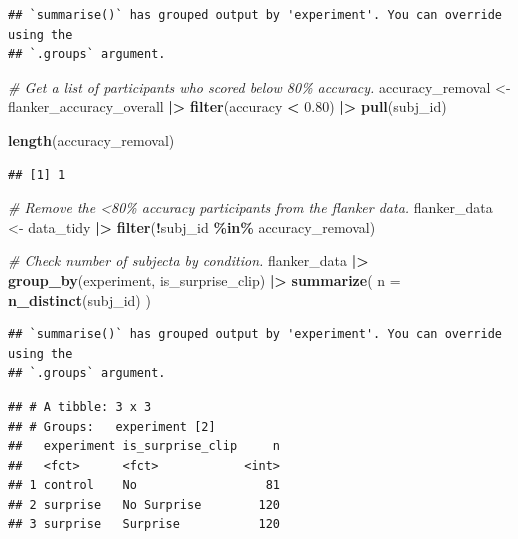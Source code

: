 \documentclass[
]{article}
\newenvironment{Shaded}{\begin{snugshade}}{\end{snugshade}}
\newcommand{\AttributeTok}[1]{\textcolor[rgb]{0.13,0.29,0.53}{#1}}
\newcommand{\CommentTok}[1]{\textcolor[rgb]{0.56,0.35,0.01}{\textit{#1}}}
\newcommand{\FloatTok}[1]{\textcolor[rgb]{0.00,0.00,0.81}{#1}}
\newcommand{\FunctionTok}[1]{\textcolor[rgb]{0.13,0.29,0.53}{\textbf{#1}}}
\newcommand{\NormalTok}[1]{#1}
\newcommand{\OtherTok}[1]{\textcolor[rgb]{0.56,0.35,0.01}{#1}}
\newcommand{\SpecialCharTok}[1]{\textcolor[rgb]{0.81,0.36,0.00}{\textbf{#1}}}
\begin{document}
\begin{verbatim}
## `summarise()` has grouped output by 'experiment'. You can override using the
## `.groups` argument.
\end{verbatim}

\begin{Shaded}
\begin{Highlighting}[]
\CommentTok{\# Get a list of participants who scored below 80\% accuracy.}
\NormalTok{accuracy\_removal }\OtherTok{\textless{}{-}}\NormalTok{ flanker\_accuracy\_overall }\SpecialCharTok{|\textgreater{}} 
  \FunctionTok{filter}\NormalTok{(accuracy }\SpecialCharTok{\textless{}} \FloatTok{0.80}\NormalTok{) }\SpecialCharTok{|\textgreater{}} 
  \FunctionTok{pull}\NormalTok{(subj\_id)}

\FunctionTok{length}\NormalTok{(accuracy\_removal)}
\end{Highlighting}
\end{Shaded}

\begin{verbatim}
## [1] 1
\end{verbatim}

\begin{Shaded}
\begin{Highlighting}[]
\CommentTok{\# Remove the \textless{}80\% accuracy participants from the flanker data.}
\NormalTok{flanker\_data }\OtherTok{\textless{}{-}}\NormalTok{ data\_tidy }\SpecialCharTok{|\textgreater{}} 
  \FunctionTok{filter}\NormalTok{(}\SpecialCharTok{!}\NormalTok{subj\_id }\SpecialCharTok{\%in\%}\NormalTok{ accuracy\_removal)}

\CommentTok{\# Check number of subjecta by condition.}
\NormalTok{flanker\_data }\SpecialCharTok{|\textgreater{}}
  \FunctionTok{group\_by}\NormalTok{(experiment, is\_surprise\_clip) }\SpecialCharTok{|\textgreater{}}
  \FunctionTok{summarize}\NormalTok{(}
    \AttributeTok{n =} \FunctionTok{n\_distinct}\NormalTok{(subj\_id)}
\NormalTok{  ) }
\end{Highlighting}
\end{Shaded}

\begin{verbatim}
## `summarise()` has grouped output by 'experiment'. You can override using the
## `.groups` argument.
\end{verbatim}

\begin{verbatim}
## # A tibble: 3 x 3
## # Groups:   experiment [2]
##   experiment is_surprise_clip     n
##   <fct>      <fct>            <int>
## 1 control    No                  81
## 2 surprise   No Surprise        120
## 3 surprise   Surprise           120
\end{verbatim}
\end{document}
